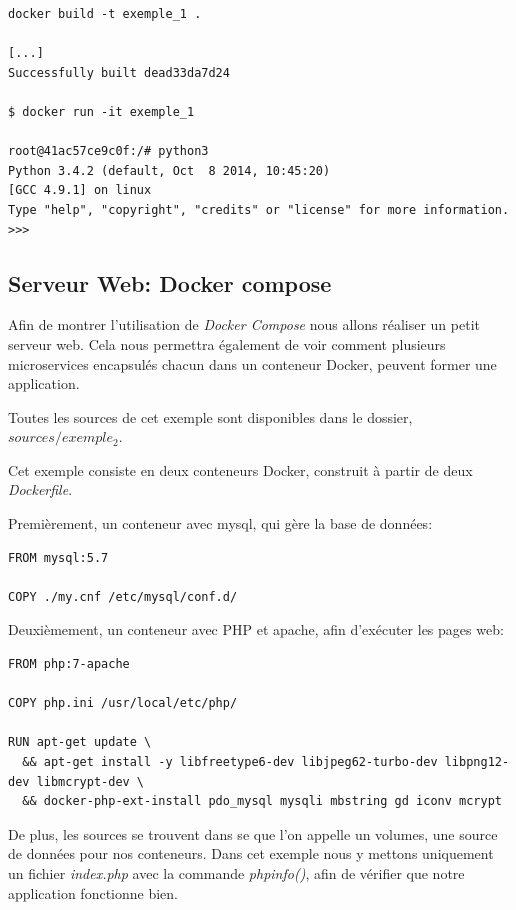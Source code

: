 \begin{lstlisting}[frame=single]
docker build -t exemple_1 .

[...]
Successfully built dead33da7d24

$ docker run -it exemple_1

root@41ac57ce9c0f:/# python3
Python 3.4.2 (default, Oct  8 2014, 10:45:20) 
[GCC 4.9.1] on linux
Type "help", "copyright", "credits" or "license" for more information.
>>> 

\end{lstlisting}

\subsection{Serveur Web: Docker compose}
Afin de montrer l'utilisation de \emph{Docker Compose} nous allons réaliser un petit serveur web. Cela nous permettra également de voir comment plusieurs microservices encapsulés chacun dans un conteneur Docker, peuvent former une application.

Toutes les sources de cet exemple sont disponibles dans le dossier, \emph{$sources/exemple_2$}.

Cet exemple consiste en deux conteneurs Docker, construit à partir de deux \emph{Dockerfile}.

Premièrement, un conteneur avec mysql, qui gère la base de données:

\begin{lstlisting}[frame=single]
FROM mysql:5.7

COPY ./my.cnf /etc/mysql/conf.d/
\end{lstlisting}

Deuxièmement, un conteneur avec PHP et apache, afin d'exécuter les pages web:

\begin{lstlisting}[frame=single]
FROM php:7-apache

COPY php.ini /usr/local/etc/php/

RUN apt-get update \
  && apt-get install -y libfreetype6-dev libjpeg62-turbo-dev libpng12-dev libmcrypt-dev \
  && docker-php-ext-install pdo_mysql mysqli mbstring gd iconv mcrypt
\end{lstlisting}

De plus, les sources se trouvent dans se que l'on appelle un volumes, une source de données pour nos conteneurs. Dans cet exemple nous y mettons uniquement un fichier \emph{index.php} avec la commande \emph{phpinfo()}, afin de vérifier que notre application fonctionne bien.

